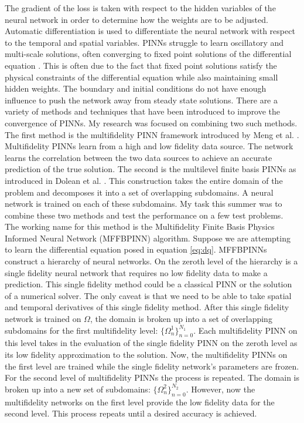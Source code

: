 \documentclass[12pt]{article}
\begin{document}
\indent The gradient of the loss is taken with respect to the hidden variables of the neural network in order to determine how the weights are to be adjusted. Automatic differentiation is used to differentiate the neural network with respect to the temporal and spatial variables. PINNs struggle to learn oscillatory and multi-scale solutions, often converging to fixed point solutions of the differential equation \cite{fixedpts}. This is often due to the fact that fixed point solutions satisfy the physical constraints of the differential equation while also maintaining small hidden weights. The boundary and initial conditions do not have enough influence to push the network away from steady state solutions. There are a variety of methods and techniques that have been introduced to improve the convergence of PINNs. My research was focused on combining two such methods. The first method is the multifidelity PINN framework introduced by Meng et al. \cite{mfpinns}. Multifidelity PINNs learn from a high and low fidelity data source. The network learns the correlation between the two data sources to achieve an accurate prediction of the true solution. The second is the multilevel finite basis PINNs as introduced in Dolean et al. \cite{fbpinns}. This construction takes the entire domain of the problem and decomposes it into a set of overlapping subdomains. A neural network is trained on each of these subdomains. My task this summer was to combine these two methods and test the performance on a few test problems. The working name for this method is the Multifidelity Finite Basis Physics Informed Neural Network (MFFBPINN) algorithm. Suppose we are attempting to learn the differential equation posed in equation \ref{eq:dq}. MFFBPINNs construct a hierarchy of neural networks. On the zeroth level of the hierarchy is a single fidelity neural network that requires no low fidelity data to make a prediction. This single fidelity method could be a classical PINN or the solution of a numerical solver. The only caveat is that we need to be able to take spatial and temporal derivatives of this single fidelity method. After this single fidelity network is trained on $\Omega$, the domain is broken up into a set of overlapping subdomains for the first multifidelity level: $\{\Omega^1_n\}_{n=0}^{N_1}$. Each multifidelity PINN on this level takes in the evaluation of the single fidelity PINN on the zeroth level as its low fidelity approximation to the solution. Now, the multifidelity PINNs on the first level are trained while the single fidelity network's parameters are frozen. For the second level of multifidelity PINNs the process is repeated. The domain is broken up into a new set of subdomains: $\{\Omega^2_n\}_{n=0}^{N_2}$. However, now the multifidelity networks on the first level provide the low fidelity data for the second level. This process repeats until a desired accuracy is achieved. 
\end{document}
